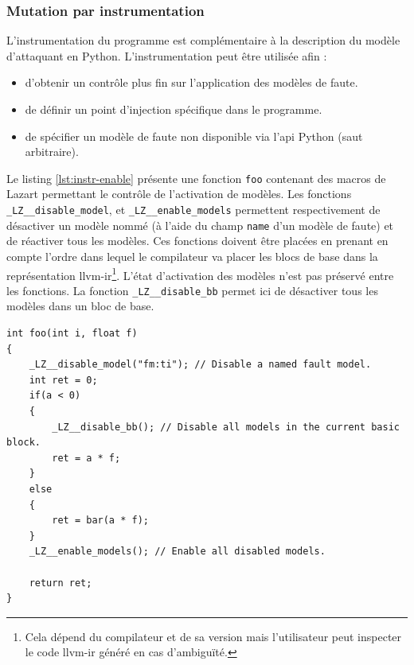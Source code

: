             \subsubsection{Mutation par instrumentation}
            \label{sec:lazart-am-instr}
                
                L'instrumentation du programme est complémentaire à la description du modèle d'attaquant en Python. L'instrumentation peut être utilisée afin :
                \begin{itemize}
                    \item d'obtenir un contrôle plus fin sur l'application des modèles de faute.
                    \item de définir un point d'injection spécifique dans le programme.
                    \item de spécifier un modèle de faute non disponible via l'\gls{api} Python (saut arbitraire).
                \end{itemize}

                \begin{sloppypar}
                Le listing \ref{lst:instr-enable} présente une fonction \texttt{foo} contenant des macros de Lazart permettant le contrôle de l'activation de modèles. Les fonctions \texttt{\_LZ\_\_disable\_model}, et \texttt{\_LZ\_\_enable\_models} permettent respectivement de désactiver un modèle nommé (à l'aide du champ \texttt{name} d'un modèle de faute) et de réactiver tous les modèles.
                Ces fonctions doivent être placées en prenant en compte l'ordre dans lequel le compilateur va placer les blocs de base dans la représentation \gls{llvm-ir}\footnote{Cela dépend du compilateur et de sa version mais l'utilisateur peut inspecter le code \gls{llvm-ir} généré en cas d'ambiguïté.}.
                L'état d'activation des modèles n'est pas préservé entre les fonctions. 
                La fonction \texttt{\_LZ\_\_disable\_bb} permet ici de désactiver tous les modèles dans un bloc de base.
                \end{sloppypar}
                       
\begin{lstlisting}     
int foo(int i, float f)
{
    _LZ__disable_model("fm:ti"); // Disable a named fault model.
    int ret = 0;
    if(a < 0)
    {
        _LZ__disable_bb(); // Disable all models in the current basic block.
        ret = a * f;
    }
    else
    {
        ret = bar(a * f);
    }
    _LZ__enable_models(); // Enable all disabled models.
    
    return ret;
}
\end{lstlisting}

